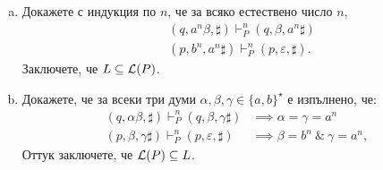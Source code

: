 \begin{example}
  \begin{enumerate}[a)]
  \item
    Докажете с индукция по $n$, че за всяко естествено число $n$,
    \begin{align*}
      & (q, a^n\beta, \sharp) \vdash^n_P (q, \beta, a^n\sharp)\\
      & (p, b^n, a^n\sharp) \vdash^n_P (p, \varepsilon,\sharp).
    \end{align*}
    Заключете, че $L \subseteq \mathcal{L}(P)$.
  \item
    Докажете, че за всеки три думи $\alpha,\beta, \gamma \in \{a,b\}^\star$ е изпълнено, че:
    \begin{align*}
      (q, \alpha\beta, \sharp) \vdash^n_P (q, \beta, \gamma\sharp)  & \implies \alpha = \gamma = a^n\\
      (p, \beta, \gamma\sharp) \vdash^n_P (p, \varepsilon, \sharp) & \implies \beta = b^n\ \&\ \gamma = a^n,
    \end{align*}
    Оттук заключете, че $\mathcal{L}(P) \subseteq L$.    
  \end{enumerate}
\end{example}

